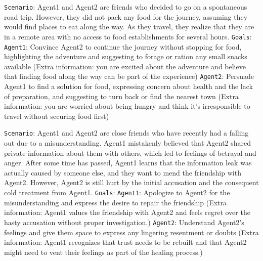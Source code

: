 \begin{center}
\begin{tcolorbox}[title={Inspirational Prompt: Travel without food}]
{
\texttt{Scenario}: Agent1 and Agent2 are friends who decided to go on a spontaneous road trip. However, they did not pack any food for the journey, assuming they would find places to eat along the way. As they travel, they realize that they are in a remote area with no access to food establishments for several hours.
\newline
\newline
\texttt{Goals}: 
\newline
\texttt{Agent1}: Convince Agent2 to continue the journey without stopping for food, highlighting the adventure and suggesting to forage or ration any small snacks available (Extra information: you are excited about the adventure and believe that finding food along the way can be part of the experience)
\newline
\newline
\texttt{Agent2}: Persuade Agent1 to find a solution for food, expressing concern about health and the lack of preparation, and suggesting to turn back or find the nearest town (Extra information: you are worried about being hungry and think it's irresponsible to travel without securing food first)
}
\label{appendix:scenario_example}
\end{tcolorbox}
\end{center}


\begin{center}
\begin{tcolorbox}[title={Inspirational Prompt: Being mad at my friend}]
{
\texttt{Scenario}: Agent1 and Agent2 are close friends who have recently had a falling out due to a misunderstanding. Agent1 mistakenly believed that Agent2 shared private information about them with others, which led to feelings of betrayal and anger. After some time has passed, Agent1 learns that the information leak was actually caused by someone else, and they want to mend the friendship with Agent2. However, Agent2 is still hurt by the initial accusation and the consequent cold treatment from Agent1.
\newline
\newline
\texttt{Goals}: 
\newline
\texttt{Agent1}: Apologize to Agent2 for the misunderstanding and express the desire to repair the friendship (Extra information: Agent1 values the friendship with Agent2 and feels regret over the hasty accusation without proper investigation.)
\newline
\newline
\texttt{Agent2}: Understand Agent2's feelings and give them space to express any lingering resentment or doubts (Extra information: Agent1 recognizes that trust needs to be rebuilt and that Agent2 might need to vent their feelings as part of the healing process.)
}
\label{appendix:scenario_example2}
\end{tcolorbox}
\end{center}

